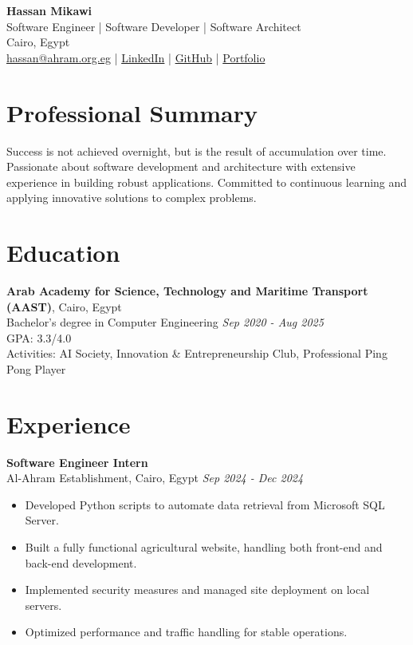 \documentclass[a4paper,10pt]{article}
\begin{document}
\begin{center}
    \textbf{\huge Hassan Mikawi} \\
    \vspace{5pt}
    Software Engineer | Software Developer | Software Architect \\
    \vspace{5pt}
    Cairo, Egypt \\
    \href{mailto:hassan@ahram.org.eg}{hassan@ahram.org.eg} | \href{https://www.linkedin.com/in/mikawi}{LinkedIn} | \href{https://github.com/Hassan220022}{GitHub} | \href{https://mikawi.org}{Portfolio}
\end{center}

\section*{Professional Summary}
Success is not achieved overnight, but is the result of accumulation over time. Passionate about software development and architecture with extensive experience in building robust applications. Committed to continuous learning and applying innovative solutions to complex problems.

\section*{Education}
\textbf{Arab Academy for Science, Technology and Maritime Transport (AAST)}, Cairo, Egypt \\
Bachelor's degree in Computer Engineering \hfill \textit{Sep 2020 - Aug 2025} \\
GPA: 3.3/4.0 \\
Activities: AI Society, Innovation & Entrepreneurship Club, Professional Ping Pong Player

\section*{Experience}
\textbf{Software Engineer Intern} \\
Al-Ahram Establishment, Cairo, Egypt \hfill \textit{Sep 2024 - Dec 2024}
\begin{itemize}[leftmargin=0.15in]
    \item Developed Python scripts to automate data retrieval from Microsoft SQL Server.
    \item Built a fully functional agricultural website, handling both front-end and back-end development.
    \item Implemented security measures and managed site deployment on local servers.
    \item Optimized performance and traffic handling for stable operations.
\end{itemize}
\end{document}
